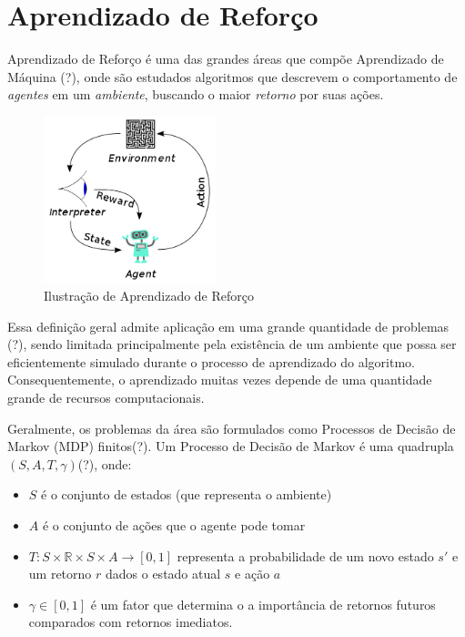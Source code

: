 \chapter{Aprendizado de Reforço}
\label{cap:reforco}

Aprendizado de Reforço é uma das grandes áreas que compõe Aprendizado de Máquina (?),
onde são estudados algoritmos que descrevem o comportamento de \textit{agentes} em um \textit{ambiente},
buscando o maior \textit{retorno} por suas ações.

\begin{figure}
    \centering
        \includegraphics[width=5cm]{figuras/rl}
    \caption{Ilustração de Aprendizado de Reforço}
\end{figure}

Essa definição geral admite aplicação em uma grande quantidade de problemas (?),
sendo limitada principalmente pela existência de um ambiente que possa ser eficientemente simulado durante o processo de aprendizado do algoritmo.
Consequentemente, o aprendizado muitas vezes depende de uma quantidade grande de recursos computacionais.

Geralmente, os problemas da área são formulados como Processos de Decisão de Markov (MDP) finitos(?).
Um Processo de Decisão de Markov é uma quadrupla $(S,A,T,\gamma)$(?), onde:
\begin{itemize}
    \item $S$ é o conjunto de estados (que representa o ambiente)
    \item $A$ é o conjunto de ações que o agente pode tomar
    \item $T: S \times \mathbb{R} \times S \times A \to [0, 1]$ representa a probabilidade de um novo estado $s'$ e um retorno $r$ dados o estado atual $s$ e ação $a$
    \item $\gamma \in [0, 1]$ é um fator que determina o a importância de retornos futuros comparados com retornos imediatos.   
\end{itemize}

